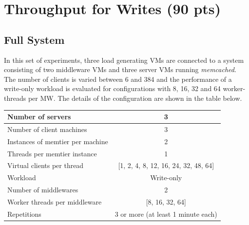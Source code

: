 \documentclass[report.tex]{subfiles}
\begin{document}
\section{Throughput for Writes (90 pts)}\label{exp4}

\subsection{Full System}

In this set of experiments, three load generating VMs are connected to a system  consisting of two middleware VMs and three server VMs running \emph{memcached}.
The number of clients is varied between 6 and 384 and the performance of a write-only workload is evaluated for configurations with 8, 16, 32 and 64 worker-threads per MW. The details of the configuration are shown in the table below.


\begin{center}
	\scriptsize{
		\begin{tabular}{|l|c|}
			\hline Number of servers                & 3          \\ 
			\hline Number of client machines        & 3          \\ 
			\hline Instances of memtier per machine & 2          \\ 
			\hline Threads per memtier instance     & 1          \\
			\hline Virtual clients per thread       & [1, 2, 4, 8, 12, 16, 24, 32, 48, 64]    \\ 
			\hline Workload                         & Write-only \\
			\hline Number of middlewares            & 2          \\
			\hline Worker threads per middleware    & [8, 16, 32, 64]    \\
			\hline Repetitions                      & 3 or more (at least 1 minute each)  \\ 
			\hline 
		\end{tabular}
	} 
\end{center}
\end{document}
